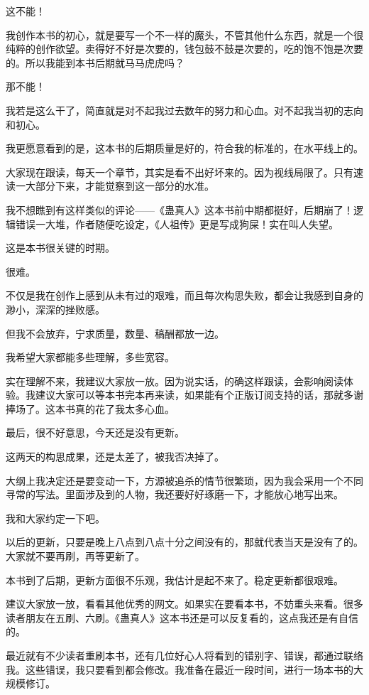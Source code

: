 \begin{this_body}
这不能！

我创作本书的初心，就是要写一个不一样的魔头，不管其他什么东西，就是一个很纯粹的创作欲望。卖得好不好是次要的，钱包鼓不鼓是次要的，吃的饱不饱是次要的。所以我能到本书后期就马马虎虎吗？

那不能！

我若是这么干了，简直就是对不起我过去数年的努力和心血。对不起我当初的志向和初心。

我更愿意看到的是，这本书的后期质量是好的，符合我的标准的，在水平线上的。

大家现在跟读，每天一个章节，其实是看不出好坏来的。因为视线局限了。只有速读一大部分下来，才能觉察到这一部分的水准。

我不想瞧到有这样类似的评论——《蛊真人》这本书前中期都挺好，后期崩了！逻辑错误一大堆，作者随便吃设定，《人祖传》更是写成狗屎！实在叫人失望。

这是本书很关键的时期。

很难。

不仅是我在创作上感到从未有过的艰难，而且每次构思失败，都会让我感到自身的渺小，深深的挫败感。

但我不会放弃，宁求质量，数量、稿酬都放一边。

我希望大家都能多些理解，多些宽容。

实在理解不来，我建议大家放一放。因为说实话，的确这样跟读，会影响阅读体验。我建议大家可以等本书完本再来读，如果能有个正版订阅支持的话，那就多谢捧场了。这本书真的花了我太多心血。

最后，很不好意思，今天还是没有更新。

这两天的构思成果，还是太差了，被我否决掉了。

大纲上我决定还是要变动一下，方源被追杀的情节很繁琐，因为我会采用一个不同寻常的写法。里面涉及到的人物，我还要好好琢磨一下，才能放心地写出来。

我和大家约定一下吧。

以后的更新，只要是晚上八点到八点十分之间没有的，那就代表当天是没有了的。大家就不要再刷，再等更新了。

本书到了后期，更新方面很不乐观，我估计是起不来了。稳定更新都很艰难。

建议大家放一放，看看其他优秀的网文。如果实在要看本书，不妨重头来看。很多读者朋友在五刷、六刷。《蛊真人》这本书还是可以反复看的，这点我还是有自信的。

最近就有不少读者重刷本书，还有几位好心人将看到的错别字、错误，都通过联络我。这些错误，我只要看到都会修改。我准备在最近一段时间，进行一场本书的大规模修订。


\end{this_body}
